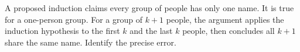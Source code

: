 A proposed induction claims every group of people has only one name. It is true for a one-person group. For a group of $k+1$ people, the argument applies the induction hypothesis to the first $k$ and the last $k$ people, then concludes all $k+1$ share the same name. Identify the precise error.

